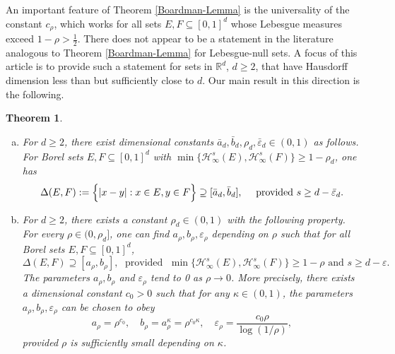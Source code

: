 \documentclass[a4paper,11pt]{amsart}
\newtheorem{thm}{\bf Theorem}[section]
\numberwithin{equation}{section}
\begin{document}
\vskip0.1in
\noindent An important feature of Theorem \ref{Boardman-Lemma} is the universality of the constant $c_{\rho}$, which works for all sets $E, F \subseteq [0,1]^d$ whose Lebesgue measures exceed $1 - \rho > \frac12$. There does not appear to be a statement in the literature analogous to Theorem \ref{Boardman-Lemma} for Lebesgue-null sets. A focus of this article is to provide such a statement for sets in $\mathbb R^d$, $d \geq 2$, that have Hausdorff dimension less than but sufficiently close to $d$. Our main result in this direction is the following.   
\begin{thm} \label{mainthm-2} 
\begin{enumerate}[(a)]
\item For $d \geq 2$, there exist dimensional constants $\bar{a}_d, \bar{b}_{d}, \rho_d, \bar{\varepsilon}_d \in (0,1)$ as follows. For Borel sets $E, F \subseteq [0,1]^d$ with $\min \bigl\{\mathcal H^s_{\infty}(E), \mathcal H^s_{\infty}(F) \bigr\} \geq 1 - \rho_d$, one has 
\begin{equation} \label{mainthm-2-conclusion} 
\Delta(E, F) := \Bigl\{|x-y| : x \in E, y \in F \Bigr\} \supseteq [\bar{a}_{d}, \bar{b}_{d}], \quad \text{ provided } s \geq d - \bar{\varepsilon}_d. 
\end{equation} \label{mainthm2-parta}
\vskip0.1in 
\item For $d \geq 2$, there exists a constant $\rho_d \in (0, 1)$ with the following property. For every $\rho \in (0, \rho_d]$, one can find $a_{\rho}, b_{\rho}, \varepsilon_{\rho}$ depending on $\rho$ such that for all Borel sets $E, F \subseteq [0,1]^d$,  
\begin{equation} \label{EF-large}
\Delta(E, F) \supseteq [a_{\rho}, b_{\rho}], \; \text{ provided } \; \min \bigl\{\mathcal H^s_{\infty}(E), \mathcal H^s_{\infty}(F) \bigr\} \geq 1 - \rho \text{ and } s \geq d - \varepsilon. 
\end{equation}  \label{mainthm2-partb} 
\noindent The parameters $a_{\rho}, b_{\rho}$ and $\varepsilon_{\rho}$ tend to 0 as $\rho \rightarrow 0$. 
\vskip0.1in
\noindent More precisely, there exists a dimensional constant $c_0 > 0$ such that for any $\kappa \in (0,1)$, the parameters $a_{\rho}, b_{\rho}, \varepsilon_{\rho}$ can be chosen to obey 
\[ a_{\rho} = \rho^{c_0}, \quad b_{\rho} = a_{\rho}^{\kappa}= \rho^{c_0 \kappa}, \quad \varepsilon_{\rho} = \frac{c_0 \rho}{\log(1/\rho)}, \]
provided $\rho$ is sufficiently small depending on $\kappa$.     
\end{enumerate} 
\end{thm}
\end{document}
